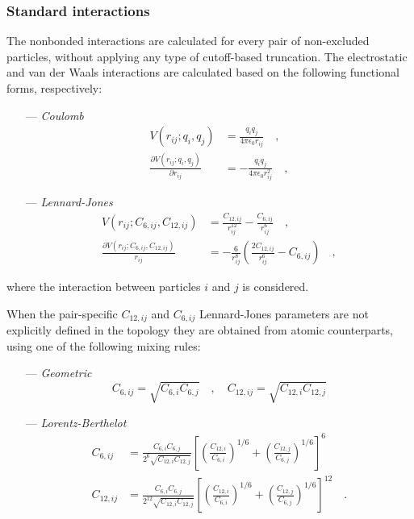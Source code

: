 \documentclass[10pt,a4paper,openany]{memoir}
\numberwithin{equation}{section}
\begin{document}
\subsubsection{Standard interactions}
\label{sec:standard-lj-interactions}

The nonbonded interactions are calculated for every pair of
non-excluded particles, without applying any type of cutoff-based
truncation.  The electrostatic and van der Waals interactions are
calculated based on the following functional forms, respectively:\cite{GROMOS-doc,GROMACS-doc}

\begin{itemize}
\item[---] \textit{Coulomb}
  \begin{align}
  \label{eq:coulomb-term}
    V(r_{ij};q_i,q_j) & = \frac{q_i q_j}{4\pi\epsilon_0 r_{ij}} \quad , \\ \nonumber
    \frac{\partial V(r_{ij};q_i,q_j)}{\partial r_{ij}} & = -\frac{q_i q_j}{4 \pi \epsilon_0 r_{ij}^2} \quad ,
\end{align}
\item[---] \textit{Lennard-Jones}
    \begin{align}
  \label{eq:lj-term}
      V(r_{ij};C_{6,ij},C_{12,ij}) & = \frac{C_{12,ij}}{r_{ij}^{12}} - \frac{C_{6,ij}}{r_{ij}^6} \quad , \\ \nonumber
      \frac{\partial V(r_{ij};C_{6,ij},C_{12,ij})}{r_{ij}} & = -\frac{6}{r_{ij}^8}\left(\frac{2C_{12,ij}}{r_{ij}^{6}} - C_{6,ij} \right) \quad ,
\end{align}
\end{itemize}
where the interaction between particles $i$ and $j$ is considered.

When the pair-specific $C_{12,ij}$ and
$C_{6,ij}$ Lennard-Jones parameters are not explicitly defined in the topology
they are obtained from atomic
counterparts, using one of the following mixing rules:
\begin{itemize}
\item [---] \textit{Geometric}
  \begin{equation}
    \label{eq:geometric-mix}
    C_{6,ij} = \sqrt{C_{6,i}C_{6,j}} \quad , \quad C_{12,ij} = \sqrt{C_{12,i}C_{12,j}}
  \end{equation}
\item [---]\textit{Lorentz-Berthelot}
  \begin{align}
    \label{eq:lorentz-mix}
    C_{6,ij} &= \frac{C_{6,i}C_{6,j}}{2^6 \sqrt{C_{12,i}C_{12,j}}}\left[\left(\frac{C_{12,i}}{C_{6,i}}\right)^{1/6} + \left(\frac{C_{12,j}}{C_{6,j}}\right)^{1/6} \right]^6  \\ \nonumber
    C_{12,ij} &= \frac{C_{6,i}C_{6,j}}{2^{12} \sqrt{C_{12,i}C_{12,j}}}\left[\left(\frac{C_{12,i}}{C_{6,i}}\right)^{1/6} + \left(\frac{C_{12,j}}{C_{6,j}}\right)^{1/6} \right]^{12} \quad .
  \end{align}
\end{itemize}
\end{document}
